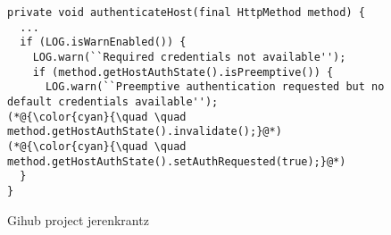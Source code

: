 \begin{figure}[t]
	\centering
\begin{lstlisting}[]
private void authenticateHost(final HttpMethod method) {
  ...
  if (LOG.isWarnEnabled()) {
    LOG.warn(``Required credentials not available'');
    if (method.getHostAuthState().isPreemptive()) {
      LOG.warn(``Preemptive authentication requested but no default credentials available'');
(*@{\color{cyan}{\quad \quad method.getHostAuthState().invalidate();}@*)
(*@{\color{cyan}{\quad \quad method.getHostAuthState().setAuthRequested(true);}@*)
  }
}
\end{lstlisting}
        \vspace{-12pt}
        \caption{Gihub project jerenkrantz}
        \vspace{-6pt}
        \label{fig:example2}
\end{figure}
